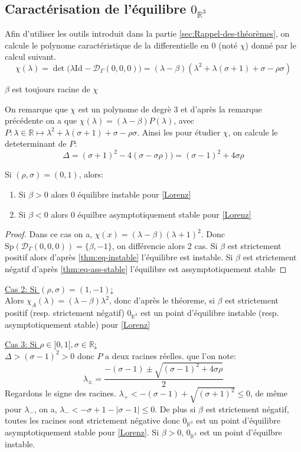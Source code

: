 \documentclass{article}
\newcommand{\R}{\mathbb{R}}
\newcommand{\id}[1][]{\ensuremath{\mathrm{Id}_{#1}}}
\newtheorem[M]{prop}{Proposition}[section]
\newtheorem[M]{propt}{Propriété}[section]
\newtheorem[L]{thm}{Théoreme}
\newtheorem[L]{cor}{Corollaire}
\begin{document}
\subsection{Caractérisation de l'équilibre $0_{\R^3}$}
Afin d'utiliser les outils introduit dans la partie \ref{sec:Rappel-des-théorèmes}, on calcule le polynome caractéristique de la differentielle en $0$ (noté $\chi$) donné par le calcul suivant.
\[
    \chi (\lambda) = \det\big(\lambda\id - \mathcal{D}_{\Gamma}(0,0,0)\big) = (\lambda - \beta)(\lambda^2 + \lambda(\sigma+1)+\sigma-\rho\sigma)
\]
\begin{example}[Remarque]
    $\beta$ est toujours racine de $\chi$
\end{example}
On remarque que $\chi$ est un polynome de degrè 3 et d'après la remarque précédente on a que $\chi(\lambda) = (\lambda - \beta)P(\lambda)$, avec $P:\lambda \in \R \mapsto \lambda^2 + \lambda(\sigma+1)+\sigma-\rho\sigma$. Ainsi les pour étudier $\chi$, on calcule le deteterminant de $P$:
\[
  \Delta = (\sigma+1)^2 - 4(\sigma-\sigma\rho)) = (\sigma-1)^2 +4\sigma\rho
\]

\begin{prop}[Cas 1:]
Si $(\rho,\sigma)=(0,1)$, alors: 
\begin{enumerate}
    \item Si $\beta > 0$ alors 0 équilibre instable pour \eqref{Lorenz}
    \item Si $\beta < 0$ alors 0 équilbre asymptotiquement stable pour \eqref{Lorenz}
\end{enumerate}
\end{prop}
\begin{proof}
    Dans ce cas on a, $\chi(x) = (\lambda-\beta)(\lambda+1)^2$. Donc $\mathrm{Sp} (\mathcal{D}_\Gamma(0,0,0))= \{ \beta, -1 \}$, on différencie alors 2 cas. Si $\beta$ est strictement positif alors d'après \ref{thm:eq-instable} l'équilibre est instable. Si $\beta$ est strictement négatif d'après \ref{thm:eq-ass-stable} l'équilibre est assymptotiquement stable
\end{proof}

\underline{Cas 2: Si $(\rho,\sigma)=(1,-1)$:}\\
Alors $\chi_A(\lambda) = (\lambda-\beta)\lambda^2$, donc d'après le théoreme, si $\beta$ est strictement positif (resp. strictement négatif) $0_{\R^3}$ est un point d'équilibre instable (resp. asymptotiquement stable) pour \eqref{Lorenz}


\underline{Cas 3: Si $\rho \in ]0,1[, \sigma \in \mathbb{R}$:}\\
$\Delta> (\sigma-1)^2 >0$ donc $P$ a deux racines réelles.
que l'on note: 
\[
    \lambda_\pm = \frac{-(\sigma-1)\pm \sqrt{(\sigma-1)^2 + 4\sigma\rho}}{2}
\]
Regardons le signe des racines. $\lambda_+ < -(\sigma-1)+ \sqrt{(\sigma+1)^2} \le 0 $, de même pour $\lambda_-$, on a, $\lambda_- < - \sigma +1- |\sigma - 1| \le 0$. De plus si $\beta$ est strictement négatif, toutes les racines sont strictement négative donc $0_{\R^3}$ est un point d'équilibre asymptotiquement stable pour \eqref{Lorenz}. Si $\beta > 0$, $0_{\R^3}$ est un point d'équilbre instable.
\end{document}
